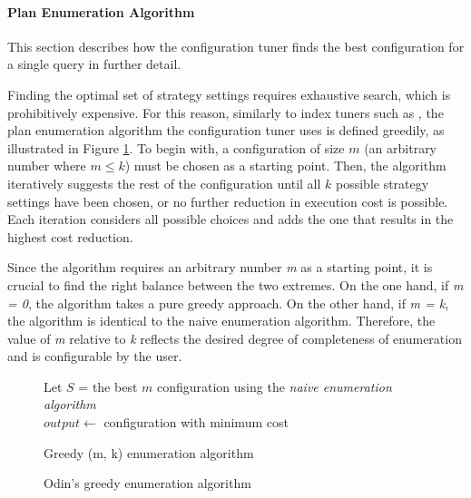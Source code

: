 \paragraph{Plan Enumeration Algorithm}

This section describes how the configuration tuner finds the best configuration for a single query in further detail.

Finding the optimal set of strategy settings requires exhaustive search, which is prohibitively expensive. For this reason, similarly to  index tuners such as \citep{chaudhuri1997}, the plan enumeration algorithm the configuration tuner uses is defined greedily, as illustrated in Figure \ref{fig:greedy_enumeration}. To begin with, a configuration of size $m$ (an arbitrary number where $m \leq k$) must be chosen as a starting point. Then, the algorithm iteratively suggests the rest of the configuration until all $k$ possible strategy settings have been chosen, or no further reduction in execution cost is possible. Each iteration considers all possible choices and adds the one that results in the highest cost reduction.

Since the algorithm requires an arbitrary number \textit{m} as a starting point, it is crucial to find the right balance between the two extremes. On the one hand, if \textit{m = 0}, the algorithm takes a pure greedy approach. On the other hand, if \textit{m = k}, the algorithm is identical to the naive enumeration algorithm. Therefore, the value of \textit{m} relative to \textit{k} reflects the desired degree of completeness of enumeration and is configurable by the user.

\begin{figure}[ht]
\begin{algorithm}[H]
\SetAlgoLined
\DontPrintSemicolon
Let $S$ = the best $m$ configuration using the \textit{naive enumeration algorithm}\\
$output \longleftarrow$ configuration with minimum cost\;
\caption{Greedy (m, k) enumeration algorithm}
\end{algorithm}
\caption{Odin's greedy enumeration algorithm}
\label{fig:greedy_enumeration}
\end{figure}

